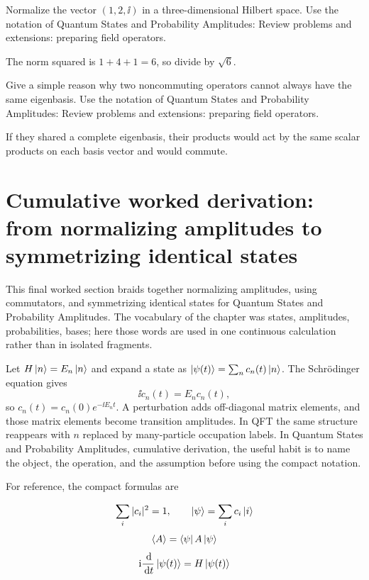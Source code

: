 \begin{exercise}
Normalize the vector \((1,2,\ii)\) in a three-dimensional Hilbert space.  Use the notation of Quantum States and Probability Amplitudes: Review problems and extensions: preparing field operators.
\begin{answer}
The norm squared is \(1+4+1=6\), so divide by \(\sqrt6\).
\end{answer}
\end{exercise}

\begin{exercise}
Give a simple reason why two noncommuting operators cannot always have the same eigenbasis.  Use the notation of Quantum States and Probability Amplitudes: Review problems and extensions: preparing field operators.
\begin{answer}
If they shared a complete eigenbasis, their products would act by the same scalar products on each basis vector and would commute.
\end{answer}
\end{exercise}



\section{Cumulative worked derivation: from normalizing amplitudes to symmetrizing identical states}

This final worked section braids together normalizing amplitudes, using commutators, and symmetrizing identical states for Quantum States and Probability Amplitudes.  The vocabulary of the chapter was states, amplitudes, probabilities, bases; here those words are used in one continuous calculation rather than in isolated fragments.

Let \(H\left|n\right\rangle=E_n\left|n\right\rangle\) and expand a state as \(\left|\psi(t)\right\rangle=\sum_nc_n(t)\left|n\right\rangle\).  The Schrödinger equation gives
\[
  \ii\dot c_n(t)=E_nc_n(t),
\]
so \(c_n(t)=c_n(0)e^{-\ii E_nt}\).  A perturbation adds off-diagonal matrix elements, and those matrix elements become transition amplitudes.  In QFT the same structure reappears with \(n\) replaced by many-particle occupation labels.  In Quantum States and Probability Amplitudes, cumulative derivation, the useful habit is to name the object, the operation, and the assumption before using the compact notation.

For reference, the compact formulas are

\[
  \sum_i |c_i|^2=1,\qquad \left|\psi\right\rangle=\sum_i c_i\left|i\right\rangle
\]
\[
  \left\langle A\right\rangle=\left\langle \psi\right|A\left|\psi\right\rangle
\]
\[
  \mathrm i\frac{\,\mathrm d}{\,\mathrm d t}\left|\psi(t)\right\rangle=H\left|\psi(t)\right\rangle
\]

